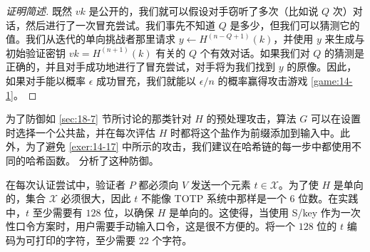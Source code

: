 \begin{proof}[证明简述]
既然 $vk$ 是公开的，我们就可以假设对手窃听了多次（比如说 $Q$ 次）对话，然后进行了一次冒充尝试。我们事先不知道 $Q$ 是多少，但我们可以猜测它的值。我们从迭代的单向挑战者那里请求 $y\leftarrow H^{(n-Q+1)}(k)$，并使用 $y$ 来生成与初始验证密钥 $vk=H^{(n+1)}(k)$ 有关的 $Q$ 个有效对话。如果我们对 $Q$ 的猜测是正确的，并且对手成功地进行了冒充尝试，对手将为我们找到 $y$ 的原像。因此，如果对手能以概率 $\epsilon$ 成功冒充，我们就能以 $\epsilon/n$ 的概率赢得攻击游戏 \ref{game:14-1}。
\end{proof}

\begin{remark}\label{remark:18-1}
为了防御如 \ref{sec:18-7} 节所讨论的那类针对 $H$ 的预处理攻击，算法 $G$ 可以在设置时选择一个公共盐，并在每次评估 $H$ 时都将这个盐作为前缀添加到输入中。此外，为了避免 \ref{exer:14-17} 中所示的攻击，我们建议在哈希链的每一步中都使用不同的哈希函数。\cite{kogan2017t} 分析了这种防御。
\end{remark}

\begin{snote}
在每次认证尝试中，验证者 $P$ 都必须向 $V$ 发送一个元素 $t\in\mathcal{X}$。为了使 $H$ 是单向的，集合 $\mathcal{X}$ 必须很大，因此 $t$ 不能像 TOTP 系统中那样是一个 $6$ 位数。在实践中，$t$ 至少需要有 $128$ 位，以确保 $H$ 是单向的。这使得，当使用 S/key 作为一次性口令方案时，用户需要手动输入口令，这是很不方便的。将一个 $128$ 位的 $t$ 编码为可打印的字符，至少需要 $22$ 个字符。
\end{snote}